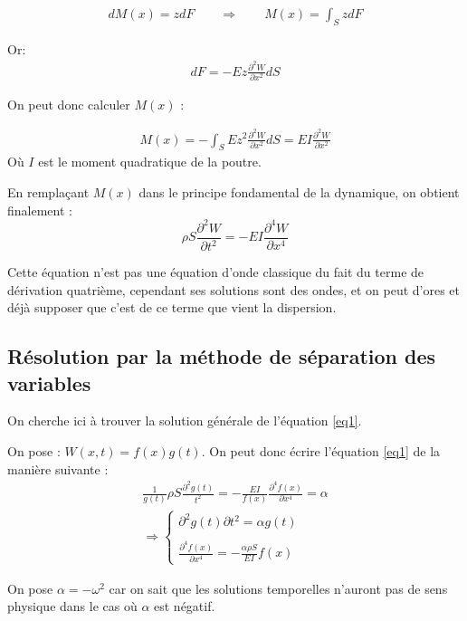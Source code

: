 \documentclass[a4paper,11pt]{report} %
\begin{document}
\begin{eqnarray*}
dM(x) = z dF \qquad \Rightarrow \qquad M(x) = \int_S z dF 
\end{eqnarray*}

Or:
\begin{eqnarray*}
dF = -E z \frac{\partial ^2 W}{\partial x^2} dS
\end{eqnarray*}

On peut donc calculer $M(x)$ :

\begin{eqnarray*}
M(x) = - \int_S E z^2 \frac{\partial ^2 W}{\partial x^2} dS = E I \frac{\partial ^2 W}{\partial x^2}
\end{eqnarray*}
Où $I$ est le moment quadratique de la poutre.

En remplaçant $M(x)$ dans le principe fondamental de la dynamique, on obtient finalement :
\begin{equation}\label{eq1}
\rho S \frac{\partial ^2 W}{\partial t^2} = -E I \frac{\partial ^4 W}{\partial x^4}
\end{equation}


Cette équation n'est pas une équation d'onde classique du fait du terme de dérivation quatrième, cependant ses solutions sont des ondes, et on peut d'ores et déjà supposer que c'est de ce terme que vient la dispersion. 

\subsection{Résolution par la méthode de séparation des variables}
On cherche ici à trouver la solution générale de l'équation \ref{eq1}.

On pose : $W(x,t) = f(x) g(t)$. On peut donc écrire l'équation \ref{eq1} de la manière suivante :
\begin{eqnarray*}
\frac{1}{g(t)} \rho S \frac{\partial ^2 g(t)}{t^2} = -\frac{EI}{f(x)} \frac{\partial ^4 f(x)}{\partial x^4} = \alpha \\
\Rightarrow \begin{cases}
{\partial ^2 g(t)}{\partial t^2} = \alpha g(t) \\~\\ \frac{\partial ^4 f(x)}{\partial x^4} = - \frac{\alpha \rho S}{EI} f(x)\end{cases}
\end{eqnarray*}

On pose $\alpha = -\omega^2$ car on sait que les solutions temporelles n'auront pas de sens physique dans le cas où $\alpha$ est négatif.
\end{document}
